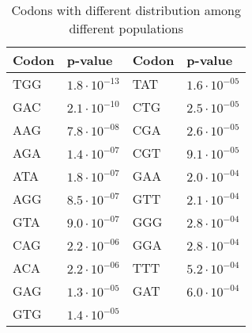 \documentclass{article}
\begin{document}
\begin{table}[h]
  \centering
  \begin{tabular}{|l|l|l|l|}
    \hline
    \bf{Codon} & \bf{p-value} & \bf{Codon} & \bf{p-value} \\
    \hline
    TGG & $1.8 \cdot 10^{-13}$ & TAT & $1.6 \cdot 10^{-05}$ \\
    GAC & $2.1 \cdot 10^{-10}$ & CTG & $2.5 \cdot 10^{-05}$ \\
    AAG & $7.8 \cdot 10^{-08}$ & CGA & $2.6 \cdot 10^{-05}$ \\
    AGA & $1.4 \cdot 10^{-07}$ & CGT & $9.1 \cdot 10^{-05}$ \\
    ATA & $1.8 \cdot 10^{-07}$ & GAA & $2.0 \cdot 10^{-04}$ \\
    AGG & $8.5 \cdot 10^{-07}$ & GTT & $2.1 \cdot 10^{-04}$ \\
    GTA & $9.0 \cdot 10^{-07}$ & GGG & $2.8 \cdot 10^{-04}$ \\
    CAG & $2.2 \cdot 10^{-06}$ & GGA & $2.8 \cdot 10^{-04}$ \\
    ACA & $2.2 \cdot 10^{-06}$ & TTT & $5.2 \cdot 10^{-04}$ \\
    GAG & $1.3 \cdot 10^{-05}$ & GAT & $6.0 \cdot 10^{-04}$ \\
    GTG & $1.4 \cdot 10^{-05}$ & & \\
    \hline
  \end{tabular}
  \caption{Codons with different distribution among different populations}
  \label{table:diff-codons}
\end{table}
\end{document}
